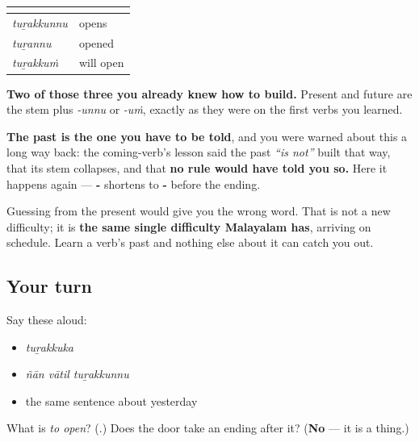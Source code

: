 \begin{grammarlens}[title={What you've built}]
\noindent
\begin{tabularx}{\linewidth}{@{}>{\raggedright\arraybackslash}X>{\raggedright\arraybackslash}X@{}}
\toprule
\textbf{} & \textbf{} \\
\midrule
\textbf{\ml{തുറക്കുന്നു}} \emph{tuṟakkunnu} & opens \\
\textbf{\ml{തുറന്നു}} \emph{tuṟannu} & opened \\
\textbf{\ml{തുറക്കും}} \emph{tuṟakkuṁ} & will open \\
\bottomrule
\end{tabularx}

\textbf{Two of those three you already knew how to build.} Present and future are the stem plus \emph{-unnu} or \emph{-uṁ}, exactly as they were on the first verbs you learned.

\textbf{The past is the one you have to be told}, and you were warned about this a long way back: the coming-verb's lesson said the past \emph{\textquotedblleft{}is not\textquotedblright{}} built that way, that its stem collapses, and that \textbf{no rule would have told you so.} Here it happens again — \textbf{-} shortens to \textbf{-} before the ending.

Guessing from the present would give you the wrong word. That is not a new difficulty; it is \textbf{the same single difficulty Malayalam has}, arriving on schedule. Learn a verb's past and nothing else about it can catch you out.
\end{grammarlens}

\subsection*{Your turn}
Say these aloud:

\begin{itemize}
\raggedright
  \item \emph{tuṟakkuka}
  \item \emph{ñān vātil tuṟakkunnu}
  \item the same sentence about yesterday
\end{itemize}

\begin{tcolorbox}[breakable,colback=teal!4,colframe=teal!35!black,title={Before you move on}]
What is \emph{to open}? (\textbf{}.) Does the door take an ending after it? (\textbf{No} — it is a thing.)
\end{tcolorbox}
